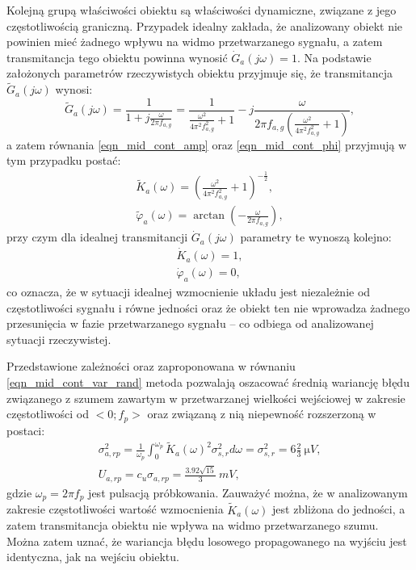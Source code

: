 Kolejną grupą właściwości obiektu są właściwości dynamiczne, związane z jego częstotliwością graniczną. Przypadek idealny zakłada, że analizowany obiekt nie powinien mieć żadnego wpływu na widmo przetwarzanego sygnału, a zatem transmitancja tego obiektu powinna wynosić $\dot{G}_{a}(j\omega) = 1$. Na podstawie założonych parametrów rzeczywistych obiektu przyjmuje się, że transmitancja $\tilde{G}_{a}(j\omega)$ wynosi:
\begin{equation}
\tilde{G}_{a}(j\omega) = \frac{1}{1 + j \frac{\omega}{2 \pi f_{a,g}}} = \frac{1}{\frac{\omega^{2}}{4 \pi^{2} f_{a,g}^{2}} + 1} - j \frac{\omega}{2 \pi f_{a,g} \left( \frac{\omega^{2}}{4 \pi^{2} f_{a,g}^{2}} + 1 \right) } \label{eqn_sym_parta_trans},
\end{equation}
a zatem równania \eqref{eqn_mid_cont_amp} oraz \eqref{eqn_mid_cont_phi} przyjmują w tym przypadku postać:
\begin{gather}
\tilde{K}_{a}(\omega) = \left( \frac{\omega^{2}}{4 \pi^{2} f_{a,g}^{2}} + 1 \right)^{-\frac{1}{2}} \label{eqn_sym_parta_amp_real}, \\
\tilde{\varphi}_{a}(\omega) = \arctan \left( -\frac{\omega}{2 \pi f_{a,g}} \right) \label{eqn_sym_parta_phi_real},
\end{gather}
przy czym dla idealnej transmitancji $\dot{G}_{a}(j\omega)$ parametry te wynoszą kolejno:
\begin{gather}
\dot{K}_{a}(\omega) = 1 \label{eqn_sym_parta_amp_ideal}, \\
\dot{\varphi}_{a}(\omega) = 0  \label{eqn_sym_parta_phi_ideal},
\end{gather}
co oznacza, że w sytuacji idealnej wzmocnienie układu jest niezależnie od częstotliwości sygnału i równe jedności oraz że obiekt ten nie wprowadza żadnego przesunięcia w fazie przetwarzanego sygnału -- co odbiega od analizowanej sytuacji rzeczywistej.

Przedstawione zależności oraz zaproponowana w równaniu \eqref{eqn_mid_cont_var_rand} metoda pozwalają oszacować średnią wariancję błędu związanego z szumem zawartym w przetwarzanej wielkości wejściowej w zakresie częstotliwości od $<0;f_{p}>$ oraz związaną z nią niepewność rozszerzoną w postaci:
\begin{gather}
\sigma_{a,rp}^{2} = \frac{1}{\omega_{p}} \int _{0} ^{\omega_{p}} \tilde{K}_{a}(\omega)^{2} \sigma_{s,r}^{2} d\omega = \sigma_{s,r}^{2} = 6 \frac{2}{3} ~\unit{\micro V} \label{eqn_sym_parta_rand_prop_var}, \\
U_{a,rp} = c_{u} \sigma_{a,rp} = \frac{3.92 \sqrt{15}}{3} ~\unit{mV} \label{eqn_sym_parta_rand_prop_unc},
\end{gather}
gdzie $\omega_{p} = 2 \pi f_{p}$ jest pulsacją próbkowania. Zauważyć można, że w analizowanym zakresie częstotliwości wartość wzmocnienia $\tilde{K}_{a}(\omega)$ jest zbliżona do jedności, a zatem transmitancja obiektu nie wpływa na widmo przetwarzanego szumu. Można zatem uznać, że wariancja błędu losowego propagowanego na wyjściu jest identyczna, jak na wejściu obiektu.

